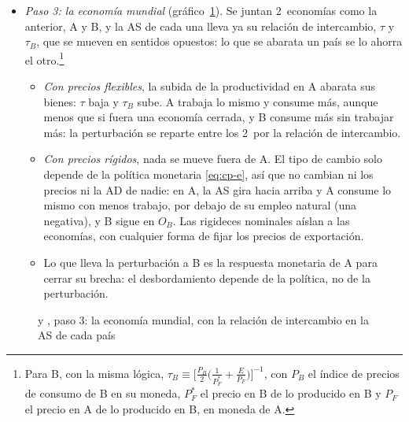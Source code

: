 \documentclass[11pt]{article}
\begin{document}
\begin{itemize}
\item \emph{Paso 3: la economía mundial} (gráfico~\ref{fig:cp-pcp-paso1}). Se juntan 2~economías como la anterior, A y B, y la AS de cada una lleva ya su relación de intercambio, $\tau$ y $\tau_B$, que se mueven en sentidos opuestos: lo que se abarata un país se lo ahorra el otro.\footnote{Para B, con la misma lógica, $\tau_B\equiv\big[\tfrac{P_B}{2}\big(\tfrac{1}{P^*_F}+\tfrac{E}{P_F}\big)\big]^{-1}$, con $P_B$ el índice de precios de consumo de B en su moneda, $P^*_F$ el precio en B de lo producido en B y $P_F$ el precio en A de lo producido en B, en moneda de A\nocite{CorsettiPesenti2009}.}
  \begin{itemize}
  \item \emph{Con precios flexibles}, la subida de la productividad en A abarata sus bienes: $\tau$ baja y $\tau_B$ sube. A trabaja lo mismo y consume más, aunque menos que si fuera una economía cerrada, y B consume más sin trabajar más: la perturbación se reparte entre los 2~por la relación de intercambio.
  \item \emph{Con precios rígidos}, nada se mueve fuera de A. El tipo de cambio solo depende de la política monetaria \eqref{eq:cp-e}, así que no cambian ni los precios ni la AD de nadie: en A, la AS gira hacia arriba y A consume lo mismo con menos trabajo, por debajo de su empleo natural (una  negativa), y B sigue en $O_B$. Las rigideces nominales aíslan a las economías, con cualquier forma de fijar los precios de exportación.
  \item Lo que lleva la perturbación a B es la respuesta monetaria de A para cerrar su brecha: el desbordamiento depende de la política, no de la perturbación.
  \end{itemize}
\end{itemize}

\begin{figure}[H]
\centering
\caption{ y , paso 3: la economía mundial, con la relación de intercambio en la AS de cada país}\label{fig:cp-pcp-paso1}
\end{figure}
\end{document}
